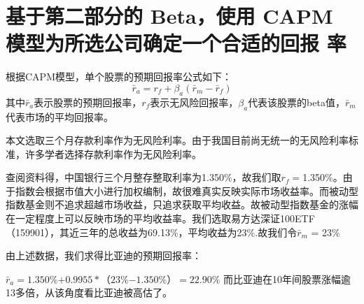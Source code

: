 \documentclass[UTF8]{ctexart}
\begin{document}
\section{基于第二部分的 Beta，使用 CAPM 模型为所选公司确定一个合适的回报 
率}
根据CAPM模型，单个股票的预期回报率公式如下：
$$\bar{r}_{a} = r_{f}+\beta_{a}(\bar{r}_{m}-\bar{r}_{f})$$
其中$\bar{r}_{a}$表示股票的预期回报率，$r_{f}$表示无风险回报率，$\beta_{a}$代表该股票的beta值，$\bar{r}_{m}$代表市场的平均回报率。\par
本文选取三个月存款利率作为无风险利率。由于我国目前尚无统一的无风险利率标准，许多学者选择存款利率作为无风险利率\cite{ref3}。\par
查阅资料得，中国银行三个月整存整取利率为1.350$\%$，故我们取$r_{f}=$1.350$\%$。由于指数会根据市值大小进行加权编制，故很难真实反映实际市场收益率。而被动型指数基金则不追求超越市场收益，只追求获取平均收益。故被动型指数基金的涨幅在一定程度上可以反映市场的平均收益率。我们选取易方达深证100ETF（159901），其近三年的总收益为69.13$\%$，平均收益为23$\%$.故我们令$\bar{r}_{m}$ = 23$\%$\par
由上述数据，我们求得比亚迪的预期回报率：\par

$\bar{r}_{a} =1.350$\%$ + 0.9955*（23$\%$ - 1.350$\%$） = 22.90\%$
而比亚迪在10年间股票涨幅逾13多倍，从该角度看比亚迪被高估了。
\end{document}
